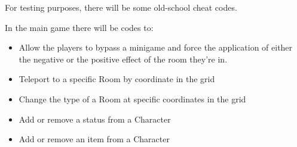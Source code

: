 For testing purposes, there will be some old-school cheat codes.

In the main game there will be codes to:

\begin{itemize}
	\item Allow the players to bypass a minigame and force the application of either the negative or the positive effect of the room they're in.
	\item Teleport to a specific Room by coordinate in the grid
	\item Change the type of a Room at specific coordinates in the grid
	\item Add or remove a status from a Character
	\item Add or remove an item from a Character
\end{itemize}

\pagebreak 